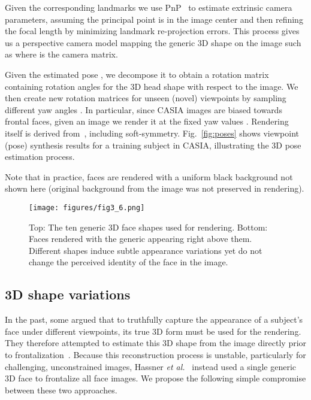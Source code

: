 \documentclass[runningheads]{llncs}
\begin{document}
Given the corresponding landmarks  we use PnP~\cite{hartley2003multiple} to estimate extrinsic camera parameters, assuming the principal point is in the image center and then refining the focal length by minimizing landmark re-projection errors. This process gives us a perspective camera model mapping the generic 3D
shape  on the image such as  where  is the camera matrix. 

Given the estimated pose , we decompose it to obtain a rotation matrix  containing rotation angles for the 3D head shape with respect to the image. We then create new rotation matrices  for unseen (novel) viewpoints by sampling different yaw angles . In particular, since CASIA images are biased towards frontal faces, given an image  we render it at the fixed yaw values .
Rendering itself is derived from~\cite{hassner2015effective}, including soft-symmetry. Fig.~\ref{fig:poses} shows viewpoint (pose) synthesis results for a training subject in CASIA, illustrating the 3D pose estimation process.

Note that in practice, faces are rendered with a uniform black background not shown here (original background from the image was not preserved in rendering).



\begin{figure}[t]
\centering

\texttt{[image: figures/fig3\_6.png]} 
\caption{Top: The ten generic 3D face shapes used for rendering. Bottom: Faces rendered with the generic appearing right above them. Different shapes induce subtle appearance variations yet do not change the perceived identity of the face in the image.}
\label{fig:shapes}
\end{figure}



\subsection{3D shape variations}\label{sec:3d}
In the past, some argued that to truthfully capture the appearance of a subject's face under different viewpoints, its true 3D form must be used for the rendering. They therefore attempted to estimate this 3D shape from the image directly prior to frontalization~\cite{taigman2014deepface}. Because this reconstruction process is unstable, particularly for challenging, unconstrained images, Hassner \emph{et al.}~\cite{hassner2015effective} instead used a single generic 3D face to frontalize all face images. We propose the following simple compromise between these two approaches.
\end{document}
